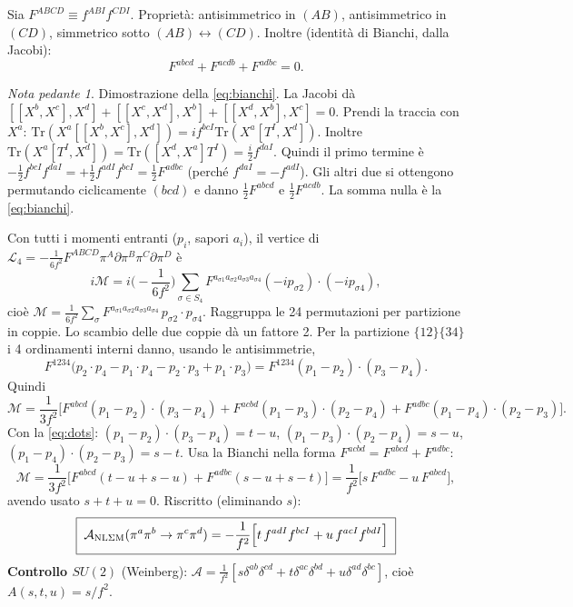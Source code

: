 \documentclass[11pt,a4paper]{article}
\numberwithin{equation}{section}
\theoremstyle{remark}
\newtheorem*{pedante}{Nota pedante}
\newcommand{\Tr}{\mathrm{Tr}}
\begin{document}
Sia $F^{ABCD}\equiv f^{ABI}f^{CDI}$. Proprietà: antisimmetrico in $(AB)$, antisimmetrico in $(CD)$, simmetrico sotto $(AB)\leftrightarrow(CD)$. Inoltre (identità di Bianchi, dalla Jacobi):
\begin{equation}
F^{abcd}+F^{acdb}+F^{adbc}=0.
\label{eq:bianchi}
\end{equation}
\begin{pedante}
Dimostrazione della \eqref{eq:bianchi}. La Jacobi dà $[[X^b,X^c],X^d]+[[X^c,X^d],X^b]+[[X^d,X^b],X^c]=0$. Prendi la traccia con $X^a$: $\Tr(X^a[[X^b,X^c],X^d])=if^{bcI}\Tr(X^a[T^I,X^d])$. Inoltre $\Tr(X^a[T^I,X^d])=\Tr([X^d,X^a]T^I)=\frac{i}{2}f^{daI}$. Quindi il primo termine è $-\frac12f^{bcI}f^{daI}=+\frac12f^{adI}f^{bcI}=\frac12F^{adbc}$ (perché $f^{daI}=-f^{adI}$). Gli altri due si ottengono permutando ciclicamente $(bcd)$ e danno $\frac12F^{abcd}$ e $\frac12F^{acdb}$. La somma nulla è la \eqref{eq:bianchi}.
\end{pedante}

Con tutti i momenti entranti ($p_i$, sapori $a_i$), il vertice di $\mathcal L_4=-\frac{1}{6f^2}F^{ABCD}\pi^A\partial\pi^B\pi^C\partial\pi^D$ è
\[
i\mathcal M=i\Big(-\frac{1}{6f^2}\Big)\sum_{\sigma\in S_4}F^{a_{\sigma1}a_{\sigma2}a_{\sigma3}a_{\sigma4}}(-ip_{\sigma2})\cdot(-ip_{\sigma4}),
\]
cioè $\mathcal M=\frac{1}{6f^2}\sum_\sigma F^{a_{\sigma1}a_{\sigma2}a_{\sigma3}a_{\sigma4}}\,p_{\sigma2}\!\cdot p_{\sigma4}$. Raggruppa le 24 permutazioni per partizione in coppie. Lo scambio delle due coppie dà un fattore 2. Per la partizione $\{12\}\{34\}$ i 4 ordinamenti interni danno, usando le antisimmetrie,
\[
F^{1234}\big(p_2\!\cdot p_4-p_1\!\cdot p_4-p_2\!\cdot p_3+p_1\!\cdot p_3\big)=F^{1234}(p_1-p_2)\cdot(p_3-p_4).
\]
Quindi
\[
\mathcal M=\frac{1}{3f^2}\Big[F^{abcd}(p_1-p_2)\!\cdot\!(p_3-p_4)+F^{acbd}(p_1-p_3)\!\cdot\!(p_2-p_4)+F^{adbc}(p_1-p_4)\!\cdot\!(p_2-p_3)\Big].
\]
Con la \eqref{eq:dots}: $(p_1-p_2)\cdot(p_3-p_4)=t-u$, $(p_1-p_3)\cdot(p_2-p_4)=s-u$, $(p_1-p_4)\cdot(p_2-p_3)=s-t$. Usa la Bianchi nella forma $F^{acbd}=F^{abcd}+F^{adbc}$:
\[
\mathcal M=\frac{1}{3f^2}\Big[F^{abcd}(t-u+s-u)+F^{adbc}(s-u+s-t)\Big]=\frac{1}{f^2}\big[s\,F^{adbc}-u\,F^{abcd}\big],
\]
avendo usato $s+t+u=0$. Riscritto (eliminando $s$):
\begin{equation}
\boxed{\;\mathcal A_{\rm NL\Sigma M}(\pi^a\pi^b\to\pi^c\pi^d)=-\frac{1}{f^2}\Big[t\,f^{adI}f^{bcI}+u\,f^{acI}f^{bdI}\Big]\;}
\label{eq:ANL}
\end{equation}
\textbf{Controllo $SU(2)$} (Weinberg): $\mathcal A=\frac1{f^2}[s\delta^{ab}\delta^{cd}+t\delta^{ac}\delta^{bd}+u\delta^{ad}\delta^{bc}]$, cioè $A(s,t,u)=s/f^2$. \checkmark
\end{document}
